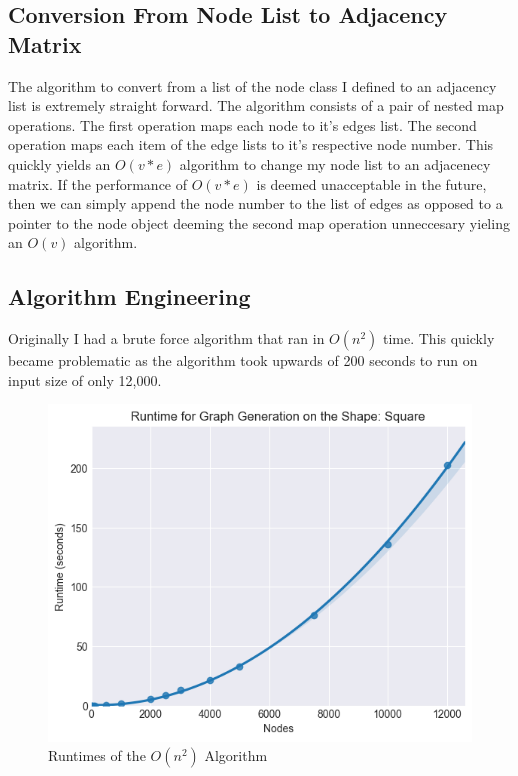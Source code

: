 \documentclass{article}
\begin{document}
		\subsection{Conversion From Node List to Adjacency Matrix}
		The algorithm to convert from a list of the node class I defined to an adjacency list is extremely straight forward.
		The algorithm consists of a pair of nested map operations.
		The first operation maps each node to it's edges list.
		The second operation maps each item of the edge lists to it's respective node number.
		This quickly yields an $O(v*e)$ algorithm to change my node list to an adjacenecy matrix.
		If the performance of $O(v*e)$ is deemed unacceptable in the future, then we can simply append the node number to the list of edges as opposed to a pointer to the node object deeming the second map operation unneccesary yieling an $O(v)$ algorithm.


	  \subsection{Algorithm Engineering}
	  Originally I had a brute force algorithm that ran in $O(n^2)$ time.
	  This quickly became problematic as the algorithm took upwards of 200 seconds to run on input size of only 12,000.
	  \begin{figure}[H]
		\centering
		\includegraphics[width=1 \textwidth]{square/runtime/runtime_chart_naive}
		\caption{Runtimes of the $O(n^2)$ Algorithm}
	  \end{figure}
\end{document}
